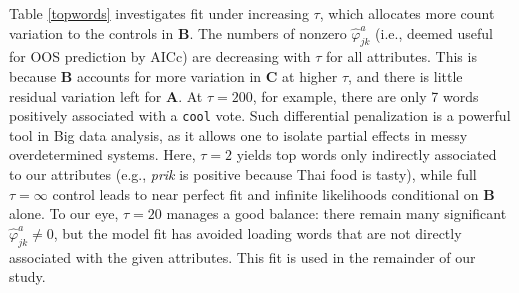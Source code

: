 \documentclass[12pt]{article}
\newcommand{\bm}[1]{\mathbf{#1}}
\newcommand{\cd}[1]{{\tt#1}}
\begin{document}
Table \ref{topwords} investigates fit under increasing $\tau$, which allocates
more  count variation to the controls in $\bm{B}$.  The numbers of nonzero
$\hat\varphi^a_{jk}$  (i.e., deemed useful for OOS prediction by AICc) are
decreasing with $\tau$ for all attributes.  This is because $\bm{B}$ accounts
for more variation in $\bm{C}$ at higher $\tau$, and  there is little residual
variation left for $\bm{A}$.  At $\tau=200$, for example, there are only 7
words positively associated with a
\cd{cool} vote. Such differential penalization is a powerful tool in Big data
analysis,  as it allows one to isolate partial effects in messy overdetermined
systems.  Here, $\tau=2$ yields top words only indirectly
associated to our attributes (e.g., {\it prik} is positive because Thai food
is tasty), while  full $\tau=\infty$ control leads to near perfect fit and
infinite likelihoods conditional on $\bm{B}$ alone. To our eye, $\tau=20$
manages a good balance: there remain many significant
$\hat\varphi^a_{jk}\neq 0$, but the model fit has avoided loading  words that
are not directly associated with the given attributes.  This fit is used in
the remainder of our study.
\end{document}
